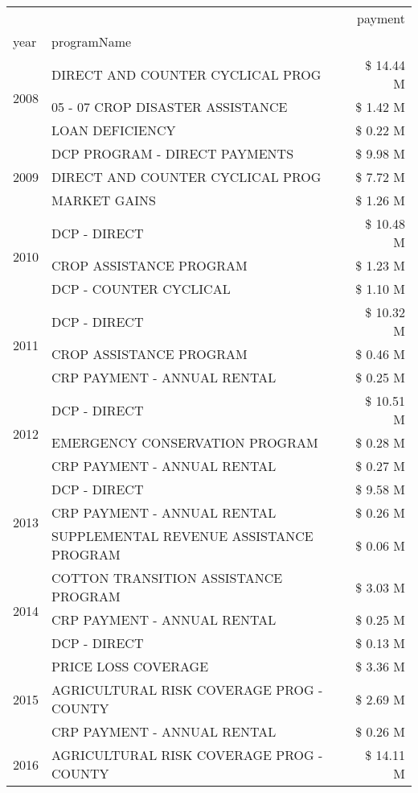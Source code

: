 \begin{tabular}{llr}
\toprule
 &  & payment \\
year & programName &  \\
\midrule
\multirow[t]{3}{*}{2008} & DIRECT AND COUNTER CYCLICAL PROG & \$ 14.44 M \\
 & 05 - 07 CROP DISASTER ASSISTANCE & \$ 1.42 M \\
 & LOAN DEFICIENCY & \$ 0.22 M \\
\cline{1-3}
\multirow[t]{3}{*}{2009} & DCP PROGRAM - DIRECT PAYMENTS & \$ 9.98 M \\
 & DIRECT AND COUNTER CYCLICAL PROG & \$ 7.72 M \\
 & MARKET GAINS & \$ 1.26 M \\
\cline{1-3}
\multirow[t]{3}{*}{2010} & DCP - DIRECT & \$ 10.48 M \\
 & CROP ASSISTANCE PROGRAM & \$ 1.23 M \\
 & DCP - COUNTER CYCLICAL & \$ 1.10 M \\
\cline{1-3}
\multirow[t]{3}{*}{2011} & DCP - DIRECT & \$ 10.32 M \\
 & CROP ASSISTANCE PROGRAM & \$ 0.46 M \\
 & CRP PAYMENT - ANNUAL RENTAL & \$ 0.25 M \\
\cline{1-3}
\multirow[t]{3}{*}{2012} & DCP - DIRECT & \$ 10.51 M \\
 & EMERGENCY CONSERVATION PROGRAM & \$ 0.28 M \\
 & CRP PAYMENT - ANNUAL RENTAL & \$ 0.27 M \\
\cline{1-3}
\multirow[t]{3}{*}{2013} & DCP - DIRECT & \$ 9.58 M \\
 & CRP PAYMENT - ANNUAL RENTAL & \$ 0.26 M \\
 & SUPPLEMENTAL REVENUE ASSISTANCE PROGRAM & \$ 0.06 M \\
\cline{1-3}
\multirow[t]{3}{*}{2014} & COTTON TRANSITION ASSISTANCE PROGRAM & \$ 3.03 M \\
 & CRP PAYMENT - ANNUAL RENTAL & \$ 0.25 M \\
 & DCP - DIRECT & \$ 0.13 M \\
\cline{1-3}
\multirow[t]{3}{*}{2015} & PRICE LOSS COVERAGE & \$ 3.36 M \\
 & AGRICULTURAL RISK COVERAGE PROG - COUNTY & \$ 2.69 M \\
 & CRP PAYMENT - ANNUAL RENTAL & \$ 0.26 M \\
\cline{1-3}
\multirow[t]{3}{*}{2016} & AGRICULTURAL RISK COVERAGE PROG - COUNTY & \$ 14.11 M \\

\end{tabular}

